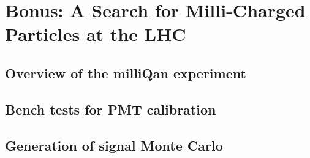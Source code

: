 \chapter{Bonus: A Search for Milli-Charged Particles at the LHC}

\section{Overview of the milliQan experiment}

\section{Bench tests for PMT calibration}

\section{Generation of signal Monte Carlo}

